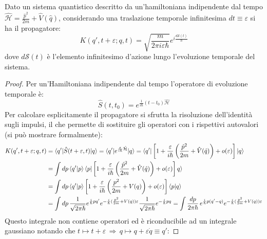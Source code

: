 \begin{proposition}
	Dato un sistema quantistico descritto da un'hamiltoniana indipendente dal tempo $ \hat{\mathcal{H}} = \frac{\hat{p}^2}{2m} + \hat{V}(\hat{q}) $, considerando una traslazione temporale infinitesima $ dt \equiv \varepsilon $ si ha il propagatore:
	\begin{equation}
		K(q',t + \varepsilon ; q,t) = \sqrt{\frac{m}{2\pi i \varepsilon \hbar}} e^{i \frac{d\mathcal{S}(t)}{\hbar}}
		\label{eq:4.16}
	\end{equation}
	dove $ d\mathcal{S}(t) $ è l'elemento infinitesimo d'azione lungo l'evoluzione temporale del sistema.
\end{proposition}
\begin{proof}
	Per un'Hamiltoniana indipendente dal tempo l'operatore di evoluzione temporale è:
	\begin{equation*}
		\hat{S}(t,t_0) = e^{\frac{1}{i\hbar} (t - t_0) \hat{\mathcal{H}}}
	\end{equation*}
	Per calcolare esplicitamente il propagatore si sfrutta la risoluzione dell'identità sugli impulsi, il che permette di sostituire gli operatori con i rispettivi autovalori (si può mostrare formalmente):
	\begin{equation*}
		\begin{split}
			K(q',t+\varepsilon ; q,t)
			&= \braket{q' | \hat{S}(t+\varepsilon,t) | q} = \braket{q' | e^{\frac{\varepsilon}{i\hbar} \hat{\mathcal{H}}} | q} = \braket{q' | \left[ 1 + \frac{\varepsilon}{i\hbar} \left( \frac{\hat{p}^2}{2m} + \hat{V}(\hat{q}) \right) + o(\varepsilon) \right] | q} \\
			&= \int dp \braket{q' | p} \braket{p | \left[ 1 + \frac{\varepsilon}{i\hbar} \left( \frac{\hat{p}^2}{2m} + \hat{V}(\hat{q}) \right) + o(\varepsilon) \right] q} \\
			&= \int dp \braket{q' | p} \left[ 1 + \frac{\varepsilon}{i\hbar} \left( \frac{p^2}{2m} + V(q) \right) + o(\varepsilon) \right] \braket{p | q} \\
			&= \int dp\, \frac{1}{\sqrt{2\pi\hbar}} e^{\frac{i}{\hbar} p q'} e^{- \frac{i}{\hbar} ( \frac{p^2}{2m} + V(q) ) \varepsilon} \frac{1}{\sqrt{2\pi\hbar}} e^{ - \frac{i}{\hbar} pq} = \int \frac{dp}{2\pi\hbar}\, e^{\frac{i}{\hbar} p (q' - q)} e^{- \frac{i}{\hbar} ( \frac{p^2}{2m} + V(q) ) \varepsilon}
		\end{split}
	\end{equation*}
	Questo integrale non contiene operatori ed è riconducibile ad un integrale gaussiano notando che $ t \mapsto t + \varepsilon \,\Rightarrow\, q \mapsto q + \varepsilon \dot{q} \equiv q' $:

\end{proof}
